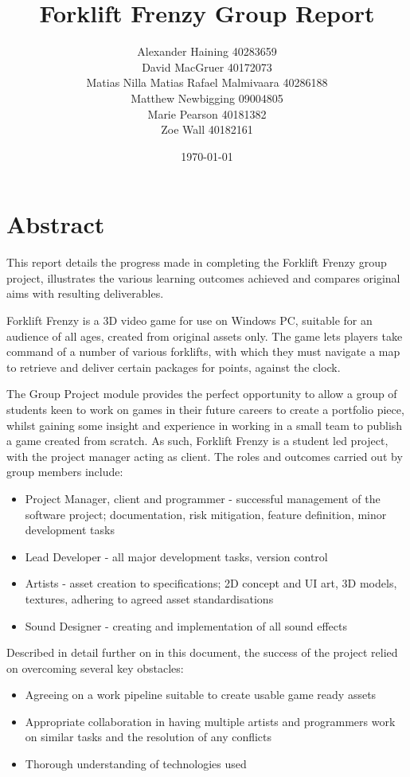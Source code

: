 \documentclass[12pt]{article}
\title{Forklift Frenzy Group Report}
\author{Alexander Haining 40283659\\David MacGruer 40172073\\Matias Nilla Matias Rafael Malmivaara 40286188\\Matthew Newbigging 09004805\\Marie Pearson 40181382\\Zoe Wall 40182161}
\date{\today}
\begin{document}
\maketitle


\newpage
\tableofcontents
\newpage
{}

\section{Abstract}
	This report details the progress made in completing the Forklift Frenzy group project, illustrates the various learning outcomes achieved and compares original aims with resulting deliverables.
		
	Forklift Frenzy is a 3D video game for use on Windows PC, suitable for an audience of all ages, created from original assets only. The game lets players take command of a number of various forklifts, with which they must navigate a map to retrieve and deliver certain packages for points, against the clock.
	
	The Group Project module provides the perfect opportunity to allow a group of students keen to work on games in their future careers to create a portfolio piece, whilst gaining some insight and experience in working in a small team to publish a game created from scratch. As such, Forklift Frenzy is a student led project, with the project manager acting as client. The roles and outcomes carried out by group members include:
	\begin{itemize}
		\item Project Manager, client and programmer - successful management of the software project; documentation, risk mitigation, feature definition, minor development tasks
		\item Lead Developer - all major development tasks, version control
		\item Artists - asset creation to specifications; 2D concept and UI
		art, 3D models, textures, adhering to agreed asset standardisations
		\item Sound Designer - creating and implementation of all sound effects
	\end{itemize}
	
	Described in detail further on in this document, the success of the project relied on overcoming several key obstacles:
	\begin{itemize}
		\item Agreeing on a work pipeline suitable to create usable game ready assets
		\item Appropriate collaboration in having multiple artists and programmers work on similar tasks and the resolution of any conflicts 
		\item Thorough understanding of technologies used
	\end{itemize}
	
\end{document}
